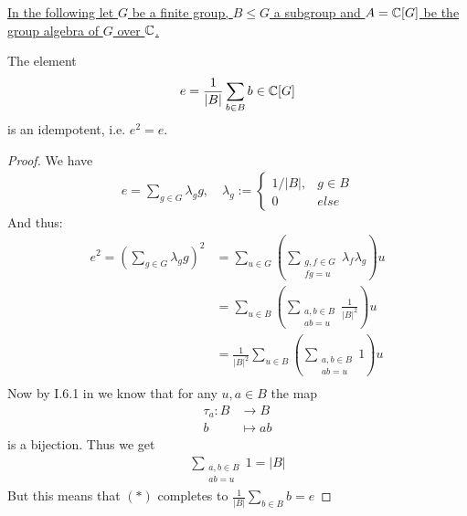 \documentclass[]{article}
\begin{document}
\underline{In the following let \(G\) be a finite group, \(B \leq G\) a subgroup and \(A={\mathbb{C}}[G]\) be the group algebra of \(G\) over \({\mathbb{C}}\).}
\begin{theorem*}
    The element
    \begin{align}
        e = \frac{1}{|B|}\sum_{b \in B}^{} b \in {\mathbb{C}}[G]
        \label{eq:idempotent}
    \end{align}
    is an idempotent, i.e. \(e^2 = e\).
\end{theorem*}
\begin{proof}
    We have
    \begin{align*}
        e = \sum_{g \in G}^{}\lambda_g g, \quad \lambda_g :=
        \begin{cases}
            1/|B|, & g \in B \\
            0 & else
        \end{cases}
    \end{align*}
    And thus:
    \begin{align*}
        e^2 = \left(\sum_{g \in G}^{} \lambda_g g\right) ^2 &= \sum_{u\in G}^{}\left(\sum_{\substack{g,f \in G \\ fg=u}}^{} \lambda_f \lambda_g\right) u \\
        &=\sum_{u\in B}^{}\left(\sum_{\substack{a,b \in B \\ ab=u}}^{} \frac{1}{|B|^2}\right) u \\
        &=\frac{1}{|B|^2}\sum_{u\in B}^{}\left(\sum_{\substack{a,b \in B \\ ab=u}}^{} 1\right) u \tag{\(*\)}\\
    \end{align*}
    Now by I.6.1 in \cite{jan} we know that for any \(u,a \in B\) the map
    \begin{align*}
        \tau_a: B &\rightarrow B \\
                b &\mapsto ab
    \end{align*}
    is a bijection. Thus we get
    \begin{align*}
        \sum_{\substack{a,b \in B \\ ab=u}}^{} 1 = |B|
    \end{align*}
    But this means that \((*)\) completes to \(\frac{1}{|B|}\sum_{b \in B}^{} b = e\)
\end{proof}
\end{document}
